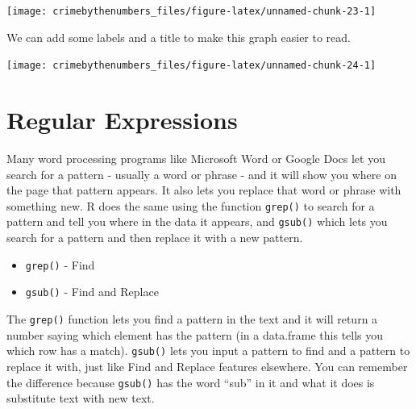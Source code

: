 \documentclass[
  12pt,
]{book}
\newenvironment{Shaded}{\begin{snugshade}}{\end{snugshade}}
\newcommand{\DataTypeTok}[1]{\textcolor[rgb]{0.27,0.27,0.27}{#1}}
\newcommand{\KeywordTok}[1]{\textcolor[rgb]{0.27,0.27,0.27}{\textbf{#1}}}
\newcommand{\NormalTok}[1]{#1}
\newcommand{\OperatorTok}[1]{\textcolor[rgb]{0.43,0.43,0.43}{\textbf{#1}}}
\newcommand{\StringTok}[1]{\textcolor[rgb]{0.5,0.5,0.5}{#1}}
\providecommand{\tightlist}{%
  \setlength{\itemsep}{0pt}\setlength{\parskip}{0pt}}
\begin{document}
\begin{center}\texttt{[image: crimebythenumbers\_files/figure-latex/unnamed-chunk-23-1]} \end{center}

We can add some labels and a title to make this graph easier to read.

\begin{Shaded}
\end{Shaded}

\begin{center}\texttt{[image: crimebythenumbers\_files/figure-latex/unnamed-chunk-24-1]} \end{center}

\hypertarget{regular-expressions}{%
\chapter{Regular Expressions}\label{regular-expressions}}

Many word processing programs like Microsoft Word or Google Docs let you search for a pattern - usually a word or phrase - and it will show you where on the page that pattern appears. It also lets you replace that word or phrase with something new. R does the same using the function \texttt{grep()} to search for a pattern and tell you where in the data it appears, and \texttt{gsub()} which lets you search for a pattern and then replace it with a new pattern.

\begin{itemize}
\tightlist
\item
  \texttt{grep()} - Find
\item
  \texttt{gsub()} - Find and Replace
\end{itemize}

The \texttt{grep()} function lets you find a pattern in the text and it will return a number saying which element has the pattern (in a data.frame this tells you which row has a match). \texttt{gsub()} lets you input a pattern to find and a pattern to replace it with, just like Find and Replace features elsewhere. You can remember the difference because \texttt{gsub()} has the word ``sub'' in it and what it does is substitute text with new text.
\end{document}

